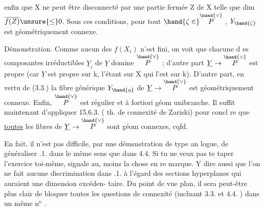 enfin que X ne peut être disconnecté par une partie fermée Z de X telle
que dim $\overline{f(Z)} \unsure{\leq} 0$.    Sous ces conditions, pour tout $\hand{\zeta \in} \overset{\hand{\vee}}{P}$ , $Y_{\hand{\zeta}}$ est
géométriquement connexe.

Démonstration.  Comme  aucun des $f(X_i)$ n'est fini, on voit
que chacune d es composantes irréductibles $\underline{Y}_i$ de $\underline{Y}$ domine $\overset{\hand{\vee}}{P}$ ;
d'autre part $\underline{Y} \to \overset{\hand{\vee}}{P}$ est propre (car $\underline{Y}$ est propre sur k, l'étant sur X
qui l'est sur k).  D'autre part, en vertu de (3.3.) la fibre générique
$Y_{\hand{\eta}}$ de $\underline{Y} \to \overset{\hand{\vee}}{P}$ est géométriquement connexe. Enfin, $\overset{\hand{\vee}}{P}$ est régulier et
à fortiori géom unibranche. Il suffit maintenant d'appliquer 15.6.3.
( th. de connexité  de Zariski) pour concl
re que \uline{toutes} les fibres  de $\underline{Y} \to \overset{\hand{\vee}}{P}$ sont géom connexes, cqfd.

 En fait,  il n'est pas difficile, par une démsnstration de type an
logue, de généraliser .1. dans le même sens que dans 4.4. Si tu ne
veux pas te taper l'exercice toi-même, signale au, moins la chose en re
marque. Y dire aussi que l'on ne fait aucune discrimination dans .1.
à l'égard des sections hyperplanes qui auraient une dimension excéden-%
 taire.  Du point de vue plan, il sera peut-être plus clair de bloquer
toutes les questions de connexité (incluant 3.3. et 4.4. ) dans un
même n$^{\text{o}}$ .
